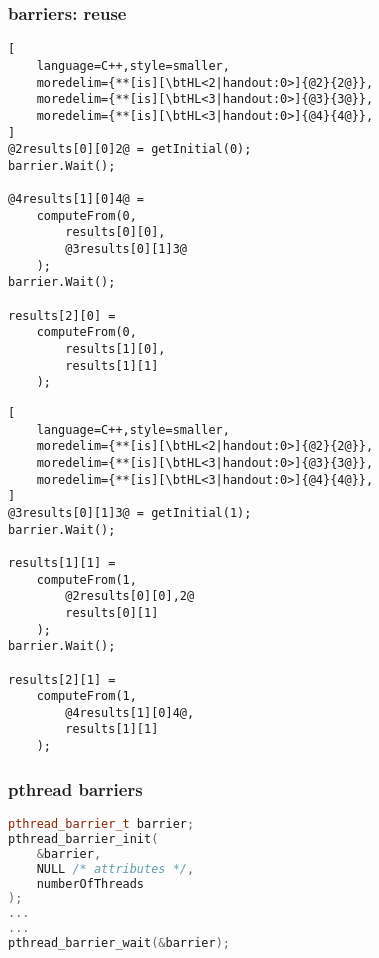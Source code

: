\begin{frame}[fragile,label=barrierReuse]\frametitle{barriers: reuse}
\begin{minipage}{0.45\textwidth}
\begin{lstlisting}[
    language=C++,style=smaller,
    moredelim={**[is][\btHL<2|handout:0>]{@2}{2@}},
    moredelim={**[is][\btHL<3|handout:0>]{@3}{3@}},
    moredelim={**[is][\btHL<3|handout:0>]{@4}{4@}},
]
@2results[0][0]2@ = getInitial(0);
barrier.Wait();

@4results[1][0]4@ =
    computeFrom(0, 
        results[0][0],
        @3results[0][1]3@
    );
barrier.Wait();

results[2][0] =
    computeFrom(0,
        results[1][0],
        results[1][1]
    );
\end{lstlisting}
\end{minipage}
\begin{minipage}{0.45\textwidth}
\begin{lstlisting}[
    language=C++,style=smaller,
    moredelim={**[is][\btHL<2|handout:0>]{@2}{2@}},
    moredelim={**[is][\btHL<3|handout:0>]{@3}{3@}},
    moredelim={**[is][\btHL<3|handout:0>]{@4}{4@}},
]
@3results[0][1]3@ = getInitial(1);
barrier.Wait();

results[1][1] =
    computeFrom(1, 
        @2results[0][0],2@
        results[0][1]
    );
barrier.Wait();

results[2][1] =
    computeFrom(1,
        @4results[1][0]4@,
        results[1][1]
    );
\end{lstlisting}
\end{minipage}
\end{frame}

\begin{frame}[fragile,label=pthreadBarrier]\frametitle{pthread barriers}
\begin{lstlisting}[language=C++,style=smaller]
pthread_barrier_t barrier;
pthread_barrier_init(
    &barrier,
    NULL /* attributes */,
    numberOfThreads
);
...
...
pthread_barrier_wait(&barrier);
\end{lstlisting}
\end{frame}

